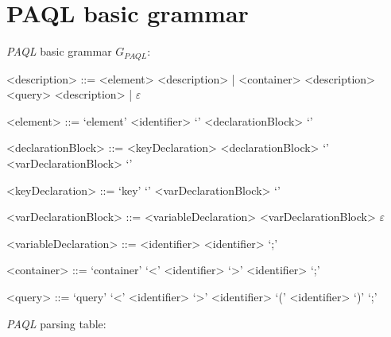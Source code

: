 \documentclass[10pt]{article}  %
\begin{document}
\section{PAQL basic grammar}
    \label{sec:basicPAQL}
    \emph{PAQL} basic grammar $G_{PAQL}$:
    \vspace{1em}
    \begin{mdframed}
        \begin{grammar}
            <description> ::=
                <element> <description> | <container> <description> \alt <query> <description> | $\varepsilon$

            <element> ::=
                `element' <identifier> `{' <declarationBlock> `}'

            <declarationBlock> ::=
                <keyDeclaration> <declarationBlock> \alt `{' <varDeclarationBlock> `}'

            <keyDeclaration> ::=
                `key' `{' <varDeclarationBlock> `}'

            <varDeclarationBlock> ::=
                <variableDeclaration> <varDeclarationBlock> \alt $\varepsilon$

            <variableDeclaration> ::=
                <identifier> <identifier> `;'

            <container> ::=
                `container' `<' <identifier> `>' <identifier> `;'

            <query> ::=
                `query' `<' <identifier> `>' <identifier> `(' <identifier> `)' `;'
        \end{grammar}
    \end{mdframed}
    \vspace{1em}
    \emph{PAQL} parsing table:
\end{document}
